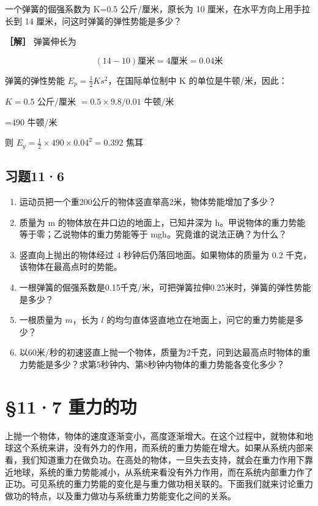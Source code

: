 一个弹簧的倔强系数为 K=0.5 公斤/厘米，原长为 10
厘米，在水平方向上用手拉长到 14 厘米，问这时弹簧的弹性势能是多少？

\textbf{［解］} 弹簧伸长为

\[
(14 - 10) \text{厘米} = 4 \text{厘米} = 0.04 \text{米}
\]

弹簧的弹性势能 \(E_{p}=\frac{1}{2}Ks^{2}\)，在国际单位制中 K
的单位是牛顿/米，因此：

\(K = 0.5\) 公斤/厘米 \(= 0.5 \times 9.8 / 0.01\) 牛顿/米

=490 牛顿/米

则 \(E_{y} = \frac{1}{2}\times 490\times 0.04^{2} = 0.392\) 焦耳

\subsection{习题11·6}\label{ux4e60ux9898116}

\begin{enumerate}
\def\labelenumi{\arabic{enumi}.}
\item
  运动员把一个重200公斤的物体竖直举高2米，物体势能增加了多少？
\item
  质量为 m 的物体放在井口边的地面上，已知井深为
  h。甲说物体的重力势能等于零；乙说物体的重力势能等于
  mgh。究竟谁的说法正确？为什么？
\item
  竖直向上抛出的物体经过 4 秒钟后仍落回地面。如果物体的质量为 0.2
  千克，该物体在最高点时的势能。
\item
  一根弹簧的倔强系数是0.15千克/米，可把弹簧拉伸0.25米时，弹簧的弹性势能是多少？
\item
  一根质量为 \(m\)，长为 \(l\)
  的均匀直体竖直地立在地面上，问它的重力势能是多少？
\item
  以60米/秒的初速竖直上抛一个物体，质量为2千克，问到达最高点时物体的重力势能是多少？求第5秒钟内、第8秒钟内物体的重力势能各变化多少？
\end{enumerate}

\section{§11·7 重力的功}\label{ux91cdux529bux7684ux529f}

上抛一个物体，物体的速度逐渐变小，高度逐渐增大。在这个过程中，就物体和地球这个系统来讲，没有外力的作用，而系统的重力势能在增大。如果从系统内部来看，我们知道重力在做负功。在高处的物体，一旦失去支持，就会在重力作用下靠近地球，系统的重力势能减小，从系统来看没有外力作用，而在系统内部重力作了正功。可见系统的重力势能的变化是与重力做功相关联的。下面我们就来讨论重力做功的特点，以及重力做功与系统重力势能变化之间的关系。

